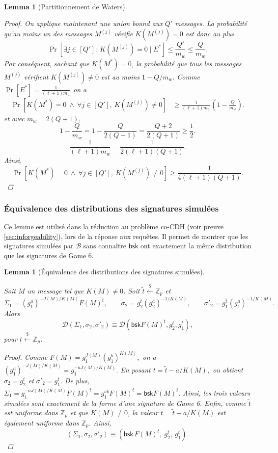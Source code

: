 \documentclass[10pt,a4paper]{article}
\theoremstyle{definition}
\theoremstyle{plain}
\newtheorem{lemma}[definition]{Lemma}
\theoremstyle{remark}
\newcommand{\sample}{\xleftarrow{\$}}
\begin{document}
\begin{lemma}[Partitionnement de Waters]
\begin{proof}
On applique maintenant une union bound aux $Q'$ messages. La probabilité
qu'au moins un des messages $M^{(j)}$ vérifie $K(M^{(j)})=0$ est donc
au plus
\[
\Pr\left[
\exists j\in[Q']:\ K(M^{(j)})=0
\mid E^*
\right]
\leq
\frac{Q'}{m_w}
\leq
\frac{Q}{m_w}.
\]
Par conséquent, sachant que $K(M^*)=0$, la probabilité que tous les
messages $M^{(j)}$ vérifient $K(M^{(j)})\neq0$ est au moins
$
1-Q/m_w.
$
Comme
$
\Pr[E^*]
=
\frac{1}{(\ell+1)m_w}
$
on a
\[
\begin{aligned}
\Pr\left[
K(M^*)=0
\ \land\
\forall j\in[Q'],\ K(M^{(j)})\neq0
\right]
&\geq
\frac{1}{(\ell+1)m_w}
\left(1-\frac{Q}{m_w}\right).
\end{aligned}
\]
et avec
$
m_w=2(Q+1),
$
\[
1-\frac{Q}{m_w}
=
1-\frac{Q}{2(Q+1)}
=
\frac{Q+2}{2(Q+1)}
\geq
\frac{1}{2}.
\]
\[
\frac{1}{(\ell+1)m_w}
=
\frac{1}{2(\ell+1)(Q+1)}.
\]
Ainsi,
\[
\Pr\left[
K(M^*)=0
\ \land\
\forall j\in[Q'],\ K(M^{(j)})\neq0
\right]
\geq
\frac{1}{4(\ell+1)(Q+1)}.
\]
\end{proof}
\end{lemma}

\subsubsection{Équivalence des distributions des signatures simulées}

Ce lemme est utilisé dans la réduction au problème co-CDH (voir preuve \ref{sec:inforgeability}), 
lors de la réponse aux requêtes. Il permet de montrer que les signatures simulées par $\mathcal{B}$
sans connaître $\mathsf{bsk}$ ont exactement la même distribution que les signatures de Game 6.

\begin{lemma}[Équivalence des distributions des signatures simulées]
\label{lem:coupling}

Soit $M$ un message tel que $K(M)\neq0$. Soit $\widetilde{t}\sample\mathbb{Z}_p$ et
\[
\Sigma_1
=
(g_1^a)^{-J(M)/K(M)}F(M)^{\widetilde{t}},
\qquad
\sigma_2
=
g_2^{\widetilde{t}}(g_2^a)^{-1/K(M)},
\qquad
\sigma'_2
=
g_1^{\widetilde{t}}(g_1^a)^{-1/K(M)}.
\]
Alors
\[
\mathcal{D}(\Sigma_1,\sigma_2,\sigma'_2)
\equiv
\mathcal{D}\left(\mathsf{bsk}F(M)^t,g_2^t,g_1^t\right),
\]
pour $t\sample\mathbb{Z}_p$.

\begin{proof}

Comme
$
F(M)=g_1^{J(M)}(g_1^b)^{K(M)},
$
on a
$
(g_1^a)^{-J(M)/K(M)}
=
g_1^{-aJ(M)/K(M)}.
$
En posant
$
t=\widetilde{t}-a/K(M),
$
on obtient
$
\sigma_2=g_2^t
$
et
$
\sigma'_2=g_1^t.
$
De plus,
$
\Sigma_1
=
g_1^{-aJ(M)/K(M)}F(M)^{\widetilde{t}}
=
g_1^{ab}F(M)^t
=
\mathsf{bsk}F(M)^t.
$
Ainsi, les trois valeurs simulées sont exactement de la forme d'une
signature de Game 6.
Enfin, comme $\widetilde{t}$ est uniforme dans $\mathbb{Z}_p$ et que
$K(M)\neq0$, la valeur
$
t=\widetilde{t}-a/K(M)
$
est également uniforme dans $\mathbb{Z}_p$. Ainsi,
\[
(\Sigma_1,\sigma_2,\sigma'_2)
\equiv
\left(\mathsf{bsk}\,F(M)^t,\ g_2^t,\ g_1^t\right).
\]

\end{proof}
\end{lemma}
\end{document}

